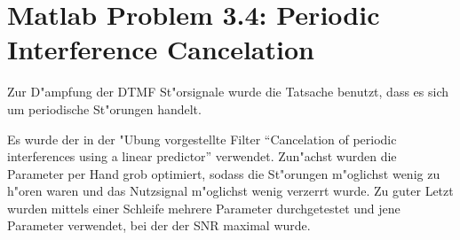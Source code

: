 \clearpage

\chapter{Matlab Problem 3.4: Periodic Interference Cancelation}

Zur D"ampfung der DTMF St"orsignale wurde die Tatsache benutzt, dass es sich um periodische St"orungen handelt.

Es wurde der in der "Ubung vorgestellte Filter ``Cancelation of periodic interferences using a linear predictor''
verwendet. Zun"achst wurden die Parameter per Hand grob optimiert, sodass die St"orungen m"oglichst
wenig zu h"oren waren und das Nutzsignal m"oglichst wenig verzerrt wurde. Zu guter Letzt wurden mittels einer
Schleife mehrere Parameter durchgetestet und jene Parameter verwendet, bei der der SNR maximal wurde.